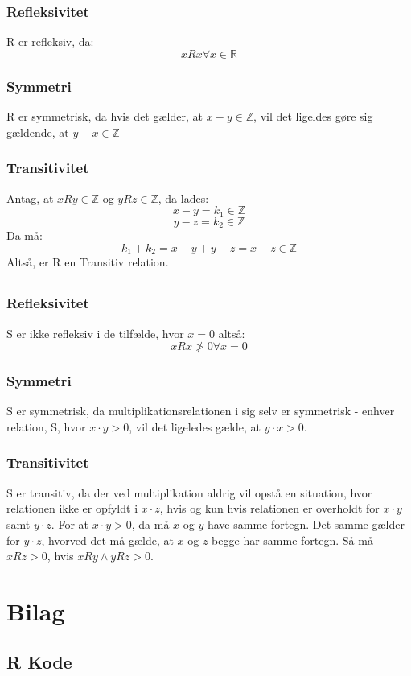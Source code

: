 \documentclass[a4paper,10pt]{article}
\begin{document}
\section{}
\subsection{}
\subsubsection*{Refleksivitet}
R er refleksiv, da:
$$
xRx \forall x \in \mathbb{R}
$$

\subsubsection*{Symmetri}
R er symmetrisk, da hvis det gælder, at $x-y \in \mathbb{Z}$, vil det ligeldes gøre sig gældende, at $y-x \in \mathbb{Z}$
\subsubsection*{Transitivitet}
Antag, at $xRy \in \mathbb{Z}$ og $yRz \in \mathbb{Z}$, da lades:
$$
x - y = k_{1} \in \mathbb{Z}
$$
$$
y - z = k_{2} \in \mathbb{Z}
$$
Da må:
$$
k_{1} + k_{2} = x - y + y - z = x - z \in \mathbb{Z}
$$
Altså, er R en Transitiv relation.

\subsection{}
\subsubsection*{Refleksivitet}
S er ikke refleksiv i de tilfælde, hvor $x = 0$ altså:
$$
xRx \ngtr 0 \forall x = 0
$$

\subsubsection*{Symmetri}
S er symmetrisk, da multiplikationsrelationen i sig selv er symmetrisk - enhver relation, S, hvor $x\cdot y > 0$, vil det ligeledes gælde, at $y\cdot x > 0$.
\subsubsection*{Transitivitet}
S er transitiv, da der ved multiplikation aldrig vil opstå en situation, hvor relationen ikke er opfyldt i $x\cdot z$, hvis og kun hvis relationen er overholdt for $x\cdot y$ samt $y\cdot z$. For at $x\cdot y > 0$, da må $x$ og $y$ have samme fortegn. Det samme gælder for $y \cdot z$, hvorved det må gælde, at $x$ og $z$ begge har samme fortegn. Så må $xRz > 0$, hvis $xRy \wedge yRz > 0$. 

\newpage

\section*{Bilag}
\subsection*{R Kode}

\end{document}

